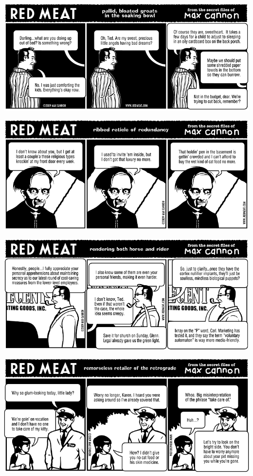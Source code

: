\documentclass[a4paper,twoside,11pt]{article}
\begin{document}
\includegraphics[width=\textwidth]{redmeat_2009-06-30.png}



\includegraphics[width=\textwidth]{redmeat_2009-07-07.png}



\includegraphics[width=\textwidth]{redmeat_2009-07-14.png}



\includegraphics[width=\textwidth]{redmeat_2009-07-21.png}
\end{document}
